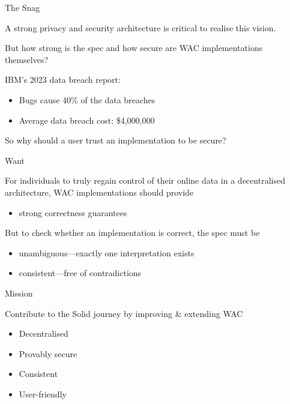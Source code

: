 \begin{frame}{The Snag}

A strong privacy and security architecture is critical to realise
this vision.

But how strong is the spec and how secure are WAC implementations
themselves?

\bigskip

IBM's 2023 data breach report:
\begin{itemize}
    \item Bugs cause 40\% of the data breaches
    \item Average data breach cost: \$4,000,000
\end{itemize}

\bigskip

So why should a user trust an implementation to be secure?

\end{frame}


\begin{frame}{Want}

For individuals to truly regain control of their online data in a
decentralised architecture, WAC implementations should provide
\begin{itemize}
  \item \alert{strong correctness guarantees}
\end{itemize}

But to check whether an implementation is correct, the spec must be
\begin{itemize}
  \item \alert{unambiguous}---exactly one interpretation exists
  \item \alert{consistent}---free of contradictions
\end{itemize}

\end{frame}


\begin{frame}{Mission}

Contribute to the Solid journey by improving \& extending WAC
\begin{itemize}
  \item Decentralised
  \item Provably secure
  \item Consistent
  \item User-friendly
\end{itemize}

\end{frame}
